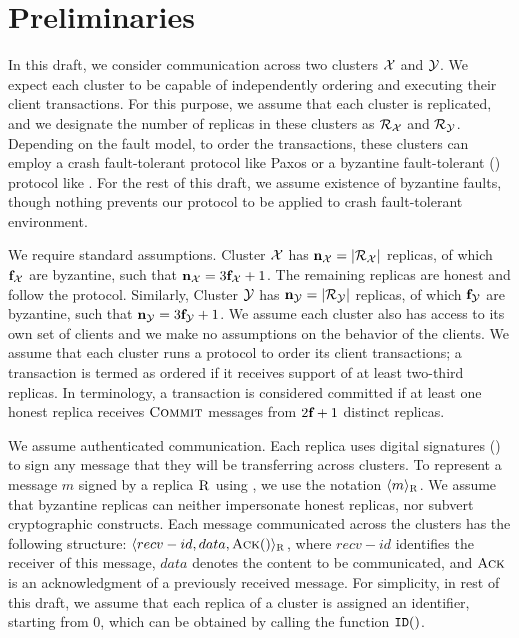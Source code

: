 \section{Preliminaries}
In this draft, we consider communication across two clusters $\mathcal{X}$ and $\mathcal{Y}$.
We expect each cluster to be capable of independently ordering and 
executing their client transactions.
For this purpose, we assume that each cluster is replicated, and we designate the 
number of replicas in these clusters as $\mathcal{R}_{\mathcal{X}}$ and $\mathcal{R}_{\mathcal{Y}}$.
Depending on the fault model, to order the transactions, 
these clusters can employ a crash fault-tolerant protocol like Paxos or 
a byzantine fault-tolerant (\BFT{}) protocol like \pbft{}.
For the rest of this draft, we assume existence of byzantine faults, 
though nothing prevents our protocol \Shadow{} to be applied to crash fault-tolerant environment.

We require standard \BFT{} assumptions. 
Cluster $\mathcal{X}$ has $\textbf{n}_{\mathcal{X}} = \lvert \mathcal{R}_{\mathcal{X}} \rvert$ replicas, 
of which $\textbf{f}_{\mathcal{X}}$ are byzantine, such that $\textbf{n}_{\mathcal{X}} = 3\textbf{f}_{\mathcal{X}}+1$. 
The remaining replicas are honest and follow the protocol.
Similarly, Cluster $\mathcal{Y}$ has $\textbf{n}_{\mathcal{Y}} = \lvert \mathcal{R}_{\mathcal{Y}} \rvert$ replicas, 
of which $\textbf{f}_{\mathcal{Y}}$ are byzantine, such that $\textbf{n}_{\mathcal{Y}} = 3\textbf{f}_{\mathcal{Y}}+1$.
We assume each cluster also has access to its own set of clients and we make no assumptions on 
the behavior of the clients.
We assume that each cluster runs a \BFT{} protocol to order its client transactions; 
a transaction is termed as ordered if it receives support of at least two-third replicas.
In \pbft{} terminology, a transaction is considered committed if at least one honest replica receives 
$\textsc{Commit}$ messages from $2\textbf{f}_{}+1$ distinct replicas.

We assume authenticated communication. 
Each replica uses digital signatures (\DS{}) to sign any message that they will be transferring across clusters.
To represent a message $m$ signed by a replica $\textsc{R}_{{}{}}$ using \DS{}, we use the notation 
{\bf $\langle m\rangle_{\textsc{R}_{{}{}}}$}.
We assume that byzantine replicas can neither impersonate honest
replicas, nor subvert cryptographic constructs.
Each message communicated across the clusters has the following structure: 
$\langle{recv-id},{data},\textsc{Ack}()\rangle_{\textsc{R}_{{}{}}}$, where $recv-id$ identifies the receiver of this message, 
$data$ denotes the content to be communicated, and $\textsc{Ack}$ is an acknowledgment of a previously received message.  
For simplicity, in rest of this draft, we assume that each replica of a cluster is assigned an identifier, starting from $0$, 
which can be obtained by calling the function $\texttt{ID}({})$.

